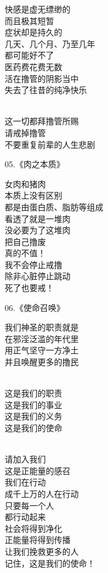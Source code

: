 \documentclass{ctexart}
\begin{document}
\begin{multicols}{2}
\begin{center}
        快感是虚无缥缈的 \\ 而且极其短暂 \\ 症状却是持久的 \\ 几天、几个月、乃至几年 \\ 都可能好不了 \\ 医药费花费无数 \\ 活在撸管的阴影当中 \\ 失去了往昔的纯净快乐

        ~\\

        这一切都拜撸管所赐 \\ 请戒掉撸管 \\ 不要重复前辈的人生悲剧
    \end{center}

    \begin{center}
        05.《肉之本质》\it

        女肉和猪肉 \\ 本质上没有区别 \\ 都是由蛋白质、脂肪等组成 \\ 看透了就是一堆肉 \\ 没必要为了这堆肉 \\ 把自己撸废 \\ 真的不值！ \\ 我不会停止戒撸 \\ 除非心脏停止跳动 \\ 死了也要戒！
    \end{center}

    \begin{center}
        06.《使命召唤》\it

        我们神圣的职责就是 \\ 在邪淫泛滥的年代里 \\ 用正气坚守一方净土 \\ 并且唤醒更多的撸民

        ~\\

        这是我们的职责 \\ 这是我们的事业 \\ 这是我们的义务 \\ 这是我们的使命

        ~\\

        请加入我们 \\ 这是正能量的感召 \\ 我们在行动 \\ 成千上万的人在行动 \\ 只要每一个人 \\ 都行动起来 \\ 社会将得到净化 \\ 正能量将得到传播 \\ 让我们挽救更多的人 \\ 记住，这是我们的使命！
    \end{center}
\end{multicols}
\end{document}
